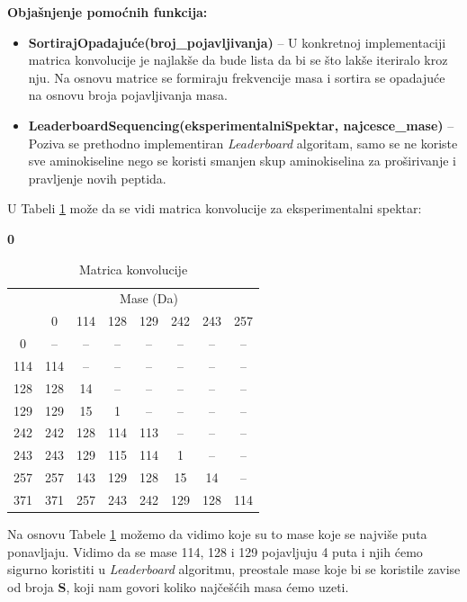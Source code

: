 \documentclass[12pt,oneside]{memoir}
\begin{document}
\noindent
\textbf{Objašnjenje pomoćnih funkcija:}
\begin{itemize}
    \item \textbf{SortirajOpadajuće(broj\_pojavljivanja)} – U konkretnoj implementaciji matrica konvolucije je najlakše da bude lista da bi se što lakše iteriralo kroz nju. Na osnovu matrice se formiraju frekvencije masa i sortira se opadajuće na osnovu broja pojavljivanja masa.
    \item \textbf{LeaderboardSequencing(eksperimentalniSpektar, najcesce\_mase)} – Poziva se prethodno implementiran \emph{Leaderboard} algoritam, samo se ne koriste sve aminokiseline nego se koristi smanjen skup aminokiselina za proširivanje i pravljenje novih peptida.
\end{itemize}

U Tabeli \ref{tab:convolution_matrix} može da se vidi matrica konvolucije za eksperimentalni spektar:
\begin{center}
{\bfseries 0       }
\end{center}

\begin{table}[h]
\centering
\renewcommand{\arraystretch}{1.3}
\begin{tabular}{|c|c|c|c|c|c|c|c|}
\hline
\multirow{2}{*}{} & \multicolumn{7}{c|}{Mase (Da)} \\ \cline{2-8}
 & 0 & 114 & 128 & 129 & 242 & 243 & 257 \\ \hline
0 & -- & -- & -- & -- & -- & -- & -- \\ \hline
114 & 114 & -- & -- & -- & -- & -- & -- \\ \hline
128 & 128 & 14 & -- & -- & -- & -- & -- \\ \hline
129 & 129 & 15 & 1 & -- & -- & -- & -- \\ \hline
242 & 242 & 128 & 114 & 113 & -- & -- & -- \\ \hline
243 & 243 & 129 & 115 & 114 & 1 & -- & -- \\ \hline
257 & 257 & 143 & 129 & 128 & 15 & 14 & -- \\ \hline
371 & 371 & 257 & 243 & 242 & 129 & 128 & 114 \\ \hline
\end{tabular}
\caption{Matrica konvolucije}
\label{tab:convolution_matrix}
\end{table}

Na osnovu Tabele \ref{tab:convolution_matrix} možemo da vidimo koje su to mase koje se najviše puta ponavljaju. Vidimo da se mase 114, 128 i 129 pojavljuju 4 puta i njih ćemo sigurno koristiti u \emph{Leaderboard} algoritmu, preostale mase koje bi se koristile zavise od broja \textbf{S}, koji nam govori koliko najčešćih masa ćemo uzeti.
\end{document}
